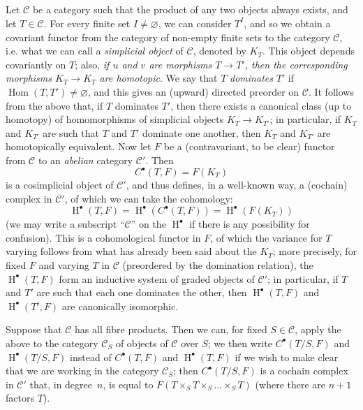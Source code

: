 \documentclass{article}
\theoremstyle{plain}
\theoremstyle{definition}
\newcommand{\cat}[1]{{\mathcal{#1}}}
\DeclareMathOperator{\Hom}{Hom}
\DeclareMathOperator{\HH}{H}
\newcommand{\oldpage}[1]{\marginpar{\footnotesize$\Big\vert$ \textit{p.~#1}}}
\begin{document}
\subsection{}
\label{A.4.a}

Let $\cat{C}$ be a category such that the product of any two objects always exists, and let $T\in\cat{C}$.
For every finite set $I\neq\varnothing$, we can consider $T^I$, and so we obtain a covariant functor from the category of non-empty finite sets to the category $\cat{C}$, i.e. what we can call a \emph{simplicial object} of $\cat{C}$, denoted by $K_T$.
This object depends covariantly on $T$;
also, \emph{if $u$ and $v$ are morphisms $T\to T'$, then the corresponding morphisms $K_T\to K_{T}$ are homotopic}.
We say that $T$ \emph{dominates} $T'$ if $\Hom(T,T')\neq\varnothing$, and this gives an (upward) directed preorder on $\cat{C}$.
It follows from the above that, if $T$ dominates $T'$, then there exists a canonical class (up to homotopy) of homomorphisms of simplicial objects $K_T\to K_{T'}$;
in particular, if $K_T$ and $K_{T'}$ are such that $T$ and $T'$ dominate one another, then $K_T$ and $K_{T'}$ are homotopically equivalent.
Now let $F$ be a (contravariant, to be clear) functor from $\cat{C}$ to an \emph{abelian} category $\cat{C}'$.
Then
\[
  C^\bullet(T,F) = F(K_T)
\]
is a cosimplicial object of $\cat{C}'$, and thus defines, in a well-known way, a (cochain) complex in $\cat{C}'$, of which we can take the cohomology:
\[
  \HH^\bullet(T,F)
  = \HH^\bullet(C^\bullet(T,F))
  = \HH^\bullet(F(K_T))
\]
(we may write a subscript ``$\cat{C}$'' on the $\HH^\bullet$ if there is any possibility for confusion).
This is a cohomological functor in $F$, of which the variance for $T$ varying follows from what has already been said about the $K_T$;
more precisely, for fixed $F$ and varying $T$ in $\cat{C}$ (preordered by the domination relation), the $\HH^\bullet(T,F)$ form an inductive system of graded objects of $\cat{C}'$;
in particular, if $T$ and $T'$ are such that each one dominates the other, then $\HH^\bullet(T,F)$ and $\HH^\bullet(T',F)$ are canonically isomorphic.

Suppose that $\cat{C}$ has all fibre products.
Then we can, for fixed $S\in\cat{C}$, apply the above to the category $\cat{C}_S$ of objects of $\cat{C}$ over $S$;
we then write $C^\bullet(T/S,F)$ and $\HH^\bullet(T/S,F)$ instead of $C^\bullet(T,F)$ and $\HH^\bullet(T,F)$ if we wish to make clear that we are working in the category $\cat{C}_S$;
then
\oldpage{190-13}
$C^\bullet(T/S,F)$ is a cochain complex in $\cat{C}'$ that, in degree~$n$, is equal to $F(T\times_S T\times_S\ldots\times_S T)$ (where there are $n+1$ factors $T$).
\end{document}
